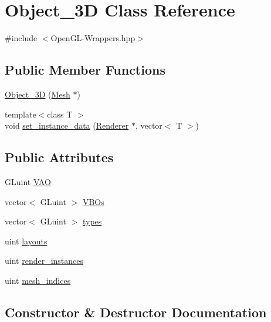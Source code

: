 \hypertarget{classObject__3D}{}\section{Object\+\_\+3D Class Reference}
\label{classObject__3D}


{\ttfamily \#include $<$Open\+G\+L-\/\+Wrappers.\+hpp$>$}

\subsection*{Public Member Functions}
\begin{DoxyCompactItemize}
\item 
\mbox{\hyperlink{classObject__3D_a818bdde880dd695da08c3e23691caa59}{Object\+\_\+3D}} (\mbox{\hyperlink{structMesh}{Mesh}} $\ast$)
\item 
{\footnotesize template$<$class T $>$ }\\void \mbox{\hyperlink{classObject__3D_acde5ca17a5d5806291c8235e20302733}{set\+\_\+instance\+\_\+data}} (\mbox{\hyperlink{classRenderer}{Renderer}} $\ast$, vector$<$ T $>$)
\end{DoxyCompactItemize}
\subsection*{Public Attributes}
\begin{DoxyCompactItemize}
\item 
G\+Luint \mbox{\hyperlink{classObject__3D_a88a13ab6c05c3d5b9368ca03cb03c021}{V\+AO}}
\item 
vector$<$ G\+Luint $>$ \mbox{\hyperlink{classObject__3D_acfd04c0df55218879d7d66ee91a22ea5}{V\+B\+Os}}
\item 
vector$<$ G\+Luint $>$ \mbox{\hyperlink{classObject__3D_a8615002b3e455ab32f57e91651c30c6a}{types}}
\item 
uint \mbox{\hyperlink{classObject__3D_a8d3d45ffb70d9725a4907d23d0f73d62}{layouts}}
\item 
uint \mbox{\hyperlink{classObject__3D_a60fe95e517a5446abd13634a005f08bb}{render\+\_\+instances}}
\item 
uint \mbox{\hyperlink{classObject__3D_a2240360a2257365eb86666b4a25bb307}{mesh\+\_\+indices}}
\end{DoxyCompactItemize}


\subsection{Constructor \& Destructor Documentation}
\mbox{\label{classObject__3D_a818bdde880dd695da08c3e23691caa59}} 
